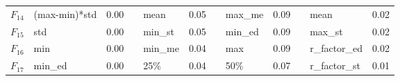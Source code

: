 \begin{table}[]
\begin{tabular}{|l|l|l|l|l|l|l|l|l|lll}
$F_{14}$                                       & (max-min)*std                                                    & 0.00                                                                &                                         & mean                                                             & 0.05                                                                &                                         & max\_me                                                          & 0.09                                                                & \multicolumn{1}{l|}{}                   & \multicolumn{1}{l|}{mean}                                        & \multicolumn{1}{l|}{0.02}                                           \\ \cline{1-3} \cline{5-6} \cline{8-9} \cline{11-12} 
$F_{15}$                                       & std                                                              & 0.00                                                                &                                         & min\_st                                                          & 0.05                                                                &                                         & min\_ed                                                          & 0.09                                                                & \multicolumn{1}{l|}{}                   & \multicolumn{1}{l|}{max\_st}                                     & \multicolumn{1}{l|}{0.02}                                           \\ \cline{1-3} \cline{5-6} \cline{8-9} \cline{11-12} 
$F_{16}$                                       & min                                                              & 0.00                                                                &                                         & min\_me                                                          & 0.04                                                                &                                         & max                                                              & 0.09                                                                & \multicolumn{1}{l|}{}                   & \multicolumn{1}{l|}{r\_factor\_ed}                               & \multicolumn{1}{l|}{0.02}                                           \\ \cline{1-3} \cline{5-6} \cline{8-9} \cline{11-12} 
$F_{17}$                                       & min\_ed                                                          & 0.00                                                                &                                         & 25\%                                                             & 0.04                                                                &                                         & 50\%                                                             & 0.07                                                                & \multicolumn{1}{l|}{}                   & \multicolumn{1}{l|}{r\_factor\_st}                               & \multicolumn{1}{l|}{0.01}                                           \\ \cline{1-3} \cline{5-6} \cline{8-9} \cline{11-12} 

\end{tabular}
\end{table}

